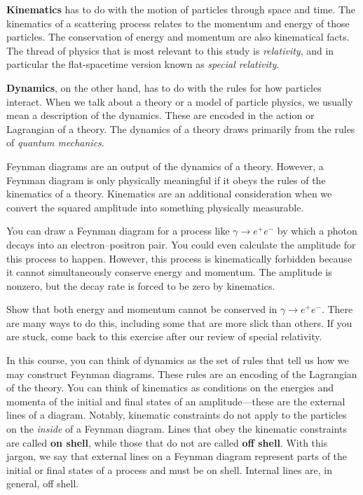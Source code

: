 \documentclass[12pt, oneside]{report}    %
\begin{document}
\textbf{Kinematics} has to do with the motion of particles through space and time. The kinematics of a scattering process relates to the momentum and energy of those particles. The conservation of energy and momentum are also kinematical facts. The thread of physics that is most relevant to this study is \emph{relativity}, and in particular the flat-spacetime version known as \emph{special relativity}.

\textbf{Dynamics}, on the other hand, has to do with the rules for how particles interact. When we talk about a theory or a model of particle physics, we usually mean a description of the dynamics. These are encoded in the action or Lagrangian of a theory. The dynamics of a theory draws primarily from the rules of \emph{quantum mechanics}.

Feynman diagrams are an output of the dynamics of a theory. However, a Feynman diagram is only physically meaningful if it obeys the rules of the kinematics of a theory. Kinematics are an additional consideration when we convert the squared amplitude into something physically measurable.
\begin{example}
You can draw a Feynman diagram for a process like $\gamma \to e^+e^-$ by which a photon decays into an electron--positron pair. You could even calculate the amplitude for this process to happen. However, this process is kinematically forbidden because it cannot simultaneously conserve energy and momentum. The amplitude is nonzero, but the decay rate is forced to be zero by kinematics.
\end{example}
\begin{exercise}
Show that both energy and momentum cannot be conserved in $\gamma \to e^+e^-$. There are many ways to do this, including some that are more slick than others. If you are stuck, come back to this exercise after our review of special relativity.
\end{exercise}

In this course, you can think of dynamics as the set of rules that tell us how we may construct Feynman diagrams. These rules are an encoding of the Lagrangian of the theory.  You can think of kinematics as conditions on the energies and momenta of the initial and final states of an amplitude---these are the external lines of a diagram. Notably, kinematic constraints do not apply to the particles on the \emph{inside} of a Feynman diagram. Lines that obey the kinematic constraints are called \textbf{on shell}, while those that do not are called \textbf{off shell}. With this jargon, we say that external lines on a Feynman diagram represent parts of the initial or final states of a process and must be on shell. Internal lines are, in general, off shell.
\end{document}
